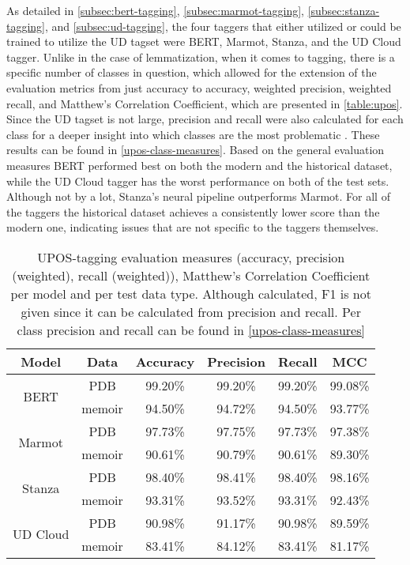 As detailed in \autoref{subsec:bert-tagging}, \autoref{subsec:marmot-tagging}, \autoref{subsec:stanza-tagging}, and \autoref{subsec:ud-tagging}, the four taggers that either utilized or could be trained to utilize the UD tagset were BERT, Marmot, Stanza, and the UD Cloud tagger. Unlike in the case of lemmatization, when it comes to tagging, there is a specific number of classes in question, which allowed for the extension of the evaluation metrics from just accuracy to accuracy, weighted precision, weighted recall, and Matthew's Correlation Coefficient, which are presented in \autoref{table:upos}. Since the UD tagset is not large, precision and recall were also calculated for each class for a deeper insight into which classes are the most problematic \citep{ud-tagset}. These results can be found in \autoref{upos-class-measures}. Based on the general evaluation measures BERT performed best on both the modern and the historical dataset, while the UD Cloud tagger has the worst performance on both of the test sets. Although not by a lot, Stanza's neural pipeline outperforms Marmot. For all of the taggers the historical dataset achieves a consistently lower score than the modern one, indicating issues that are not specific to the taggers themselves. 

\renewcommand{\arraystretch}{1.25}
\begin{table}[H]
\begin{center}
\begin{tabular}{|cc|cccc|}
\hline \bf Model & \bf Data & \bf Accuracy & \bf Precision & \bf Recall & \bf MCC \\ \hline
\multirow{2}{4em}{BERT}
& PDB & 99.20\% & 99.20\% & 99.20\% & 99.08\% \\
& memoir & 94.50\% & 94.72\% & 94.50\% & 93.77\%  \\
\multirow{2}{4em}{Marmot}
& PDB & 97.73\% & 97.75\% & 97.73\% & 97.38\% \\
& memoir & 90.61\% & 90.79\% & 90.61\% & 89.30\% \\
\multirow{2}{4em}{Stanza}
& PDB & 98.40\% & 98.41\% & 98.40\% & 98.16\% \\
& memoir & 93.31\% & 93.52\% & 93.31\% & 92.43\% \\
\multirow{2}{4em}{UD Cloud}
& PDB & 90.98\% & 91.17\% & 90.98\% & 89.59\% \\
& memoir & 83.41\% & 84.12\% & 83.41\% & 81.17\% \\ 
\hline
\end{tabular}
\caption{\label{table:upos} UPOS-tagging evaluation measures (accuracy, precision (weighted), recall (weighted)), Matthew's Correlation Coefficient per model and per test data type. Although calculated, F1 is not given since it can be calculated from precision and recall. Per class precision and recall can be found in \autoref{upos-class-measures}}
\end{center}
\end{table}

